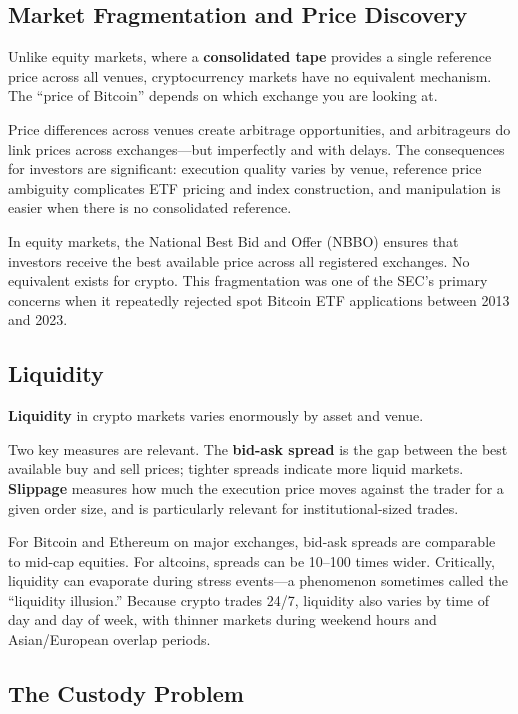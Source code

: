 \documentclass[11pt,a4paper]{article}
\newcommand{\keyword}[1]{\textbf{\textcolor{AccentOrange}{#1}}}
\begin{document}
\subsection{Market Fragmentation and Price Discovery}

Unlike equity markets, where a \keyword{consolidated tape} provides a single reference price across all venues, cryptocurrency markets have no equivalent mechanism. The ``price of Bitcoin'' depends on which exchange you are looking at.

Price differences across venues create arbitrage opportunities, and arbitrageurs do link prices across exchanges---but imperfectly and with delays. The consequences for investors are significant: execution quality varies by venue, reference price ambiguity complicates ETF pricing and index construction, and manipulation is easier when there is no consolidated reference.

In equity markets, the National Best Bid and Offer (NBBO) ensures that investors receive the best available price across all registered exchanges. No equivalent exists for crypto. This fragmentation was one of the SEC's primary concerns when it repeatedly rejected spot Bitcoin ETF applications between 2013 and 2023.

\subsection{Liquidity}

\keyword{Liquidity} in crypto markets varies enormously by asset and venue.

Two key measures are relevant. The \keyword{bid-ask spread} is the gap between the best available buy and sell prices; tighter spreads indicate more liquid markets. \keyword{Slippage} measures how much the execution price moves against the trader for a given order size, and is particularly relevant for institutional-sized trades.

For Bitcoin and Ethereum on major exchanges, bid-ask spreads are comparable to mid-cap equities. For altcoins, spreads can be 10--100 times wider. Critically, liquidity can evaporate during stress events---a phenomenon sometimes called the ``liquidity illusion.'' Because crypto trades 24/7, liquidity also varies by time of day and day of week, with thinner markets during weekend hours and Asian/European overlap periods.

\subsection{The Custody Problem}
\end{document}
